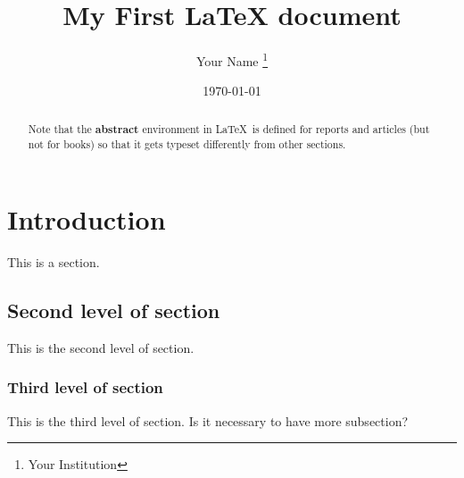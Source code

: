 \documentclass{article}
\title{My First \LaTeX{} document}
\author{Your Name \thanks{Your Institution}}
\date{\today}
\begin{document}
\maketitle

\begin {abstract} 
Note that the \textbf{abstract} environment in \LaTeX\
is defined for 
reports and articles (but not for books) so 
that it gets typeset 
differently from other sections.
\end{abstract}

\tableofcontents

\section{Introduction}

This is a section.

\subsection{Second level of section}

This is the second level of section.

\subsubsection{Third level of section}

This is the third level of section.
Is it necessary to have more subsection?
\end{document}
